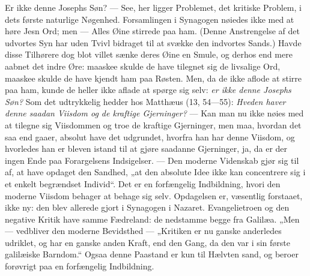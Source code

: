 \documentclass[12pt,a4paper]{book}
\begin{document}
{\large Er ikke denne Josephs Søn?} --- See, her ligger Problemet, det kritiske Problem,
i dets første naturlige Nøgenhed. Forsamlingen i Synagogen nøiedes ikke med at høre Jesn
Ord; men --- Alles Øine stirrede paa ham. (Denne Anstrengelse af det udvortes Syn har
uden Tvivl bidraget til at svække den indvortes Sands.) Havde disse Tilhørere dog blot
villet sænke deres Øine en Smule, og derhos end mere aabnet det indre Øre: maaskee skulde
de have tilegnet sig de livsalige Ord, maaskee skulde de have kjendt ham paa Røsten. Men,
da de ikke aflode at stirre paa ham, kunde de heller ikke aflade at spørge sig selv:
\emph{er ikke denne Josephs Søn?} Som det udtrykkelig hedder hos Matthæus (13, 54---55):
\emph{Hveden haver denne saadan Viisdom og de kraftige
Gjerninger?} --- Kan man nu ikke nøies med at tilegne sig Viisdommen og troe de kraftige
Gjerninger, men maa, hvordan det saa end gaaer, absolut have det udgrundet, hvorfra han
har denne Viisdom, og hvorledes han er bleven istand til at gjøre saadanne Gjerninger,
ja, da er der ingen Ende paa Forargelsens Indsigelser. --- Den moderne Videnskab gjør sig
til af, at have opdaget den Sandhed, „at den absolute Idee ikke kan concentrere sig i et
enkelt begrændset Individ“. Det er en forfængelig Indbildning, hvori den moderne Viisdom
behager at behage sig selv. Opdagelsen er, væsentlig forstaaet, ikke ny: den blev
allerede gjort i Synagogen i Nazaret. Evangelietroen og den negative Kritik have samme
Fædreland: de nedstamme begge fra Galilæa. „Men --- vedbliver den moderne Bevidsthed ---
„Kritiken er nu ganske anderledes udriklet, og har en ganske anden Kraft, end den Gang,
da den var i sin første galilæiske Barndom.“ Ogsaa denne Paastand er kun til Hælvten
sand, og beroer forøvrigt paa en forfængelig Indbildning.
\end{document}
